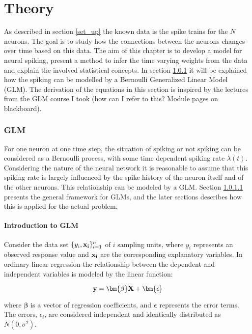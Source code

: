 
\chapter{Theory}

As described in section \ref{set_up} the known data is the spike trains for the $N$ neurons. The goal is to study how the connections between the neurons changes over time based on this data. The aim of this chapter is to develop a model for neural spiking, present a method to infer the time varying weights from the data and explain the involved statistical concepts. 
In section \ref{GLM} it will be explained how the spiking can be modelled by a Bernoulli Generalized Linear Model (GLM). The derivation of the equations in this section is inspired by the lectures from the GLM course I took (how can I refer to this? Module pages on blackboard).  

\subsection{GLM}
\label{GLM}
For one neuron at one time step, the situation of spiking or not spiking can be considered as a Bernoulli process, with some time dependent spiking rate $\lambda (t)$. Considering the nature of the neural network it is reasonable to assume that this spiking rate is largely influenced by the spike history of the neuron itself and of the other neurons. This relationship can be modeled by a GLM. Section \ref{Intro_GLM} presents the general framework for GLMs, and the later sections describes how this is applied for the actual problem. 
\subsubsection{Introduction to GLM}
\label{Intro_GLM}
Consider the data set $ \{y_{i}, \bold{x_{i}}\}_{i=1}^{n} $ of $i$ sampling units, where $y_i$ represents an observed response value and $ \bold{x_i}$ are the corresponding explanatory variables. In ordinary linear regression the relationship between the dependent and independent variables is modeled by the linear function:

\begin{equation}
    \textbf{y} = \bm{\beta}\bf X + \bm{ \epsilon}
\end{equation}

where $\bm{\beta}$ is a vector of regression coefficients, and $\bm{ \epsilon}$ represents the error terms. The errors, $\epsilon_{i}$, are considered independent and identically distributed as $N(0, \sigma^{2})$.

